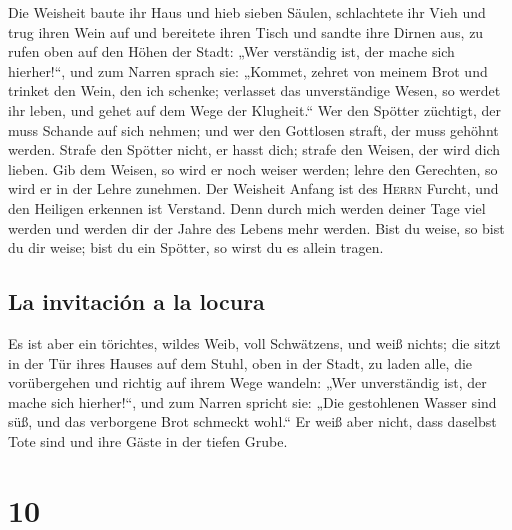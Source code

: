  Die Weisheit baute ihr Haus und hieb sieben Säulen,
 schlachtete ihr Vieh und trug ihren Wein auf und
bereitete ihren Tisch  und sandte ihre Dirnen aus, zu
rufen oben auf den Höhen der Stadt:  „Wer verständig ist,
der mache sich hierher!{}``, und zum Narren sprach sie: 
„Kommet, zehret von meinem Brot und trinket den Wein, den ich schenke;
 verlasset das unverständige Wesen, so werdet ihr leben,
und gehet auf dem Wege der Klugheit.``  Wer den Spötter
züchtigt, der muss Schande auf sich nehmen; und wer den Gottlosen
straft, der muss gehöhnt werden.  Strafe den Spötter
nicht, er hasst dich; strafe den Weisen, der wird dich lieben.
 Gib dem Weisen, so wird er noch weiser werden; lehre den
Gerechten, so wird er in der Lehre zunehmen.  Der
Weisheit Anfang ist des \textsc{Herrn} Furcht, und den Heiligen erkennen
ist Verstand.  Denn durch mich werden deiner Tage viel
werden und werden dir der Jahre des Lebens mehr werden. 
Bist du weise, so bist du dir weise; bist du ein Spötter, so wirst du es
allein tragen.

\hypertarget{la-invitaciuxf3n-a-la-locura}{%
\subsection{La invitación a la
locura}\label{la-invitaciuxf3n-a-la-locura}}

 Es ist aber ein törichtes, wildes Weib, voll Schwätzens,
und weiß nichts;  die sitzt in der Tür ihres Hauses auf
dem Stuhl, oben in der Stadt,  zu laden alle, die
vorübergehen und richtig auf ihrem Wege wandeln:  „Wer
unverständig ist, der mache sich hierher!{}``, und zum Narren spricht
sie:  „Die gestohlenen Wasser sind süß, und das
verborgene Brot schmeckt wohl.``  Er weiß aber nicht,
dass daselbst Tote sind und ihre Gäste in der tiefen Grube.

\hypertarget{section-9}{%
\section{10}\label{section-9}}

